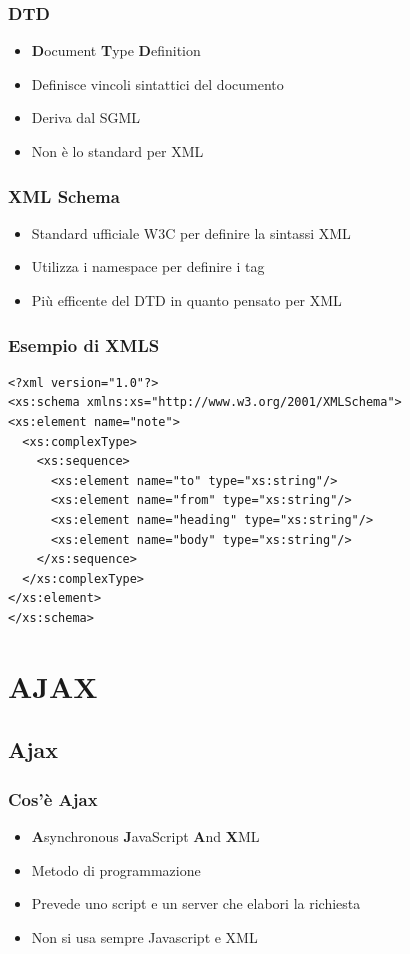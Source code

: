 \documentclass{beamer}
\begin{document}
\begin{frame}
    \frametitle{DTD}
    \begin{itemize}
    \item <1-> \textbf{D}ocument \textbf{T}ype \textbf{D}efinition
    \item <2-> Definisce vincoli sintattici del documento
    \item <3-> Deriva dal SGML
    \item <5-> Non è lo standard per XML
    \end{itemize}
\end{frame}

\begin{frame}
\frametitle{XML Schema}
\begin{itemize}
    \item <1-> Standard ufficiale W3C per definire la sintassi XML
    \item <2-> Utilizza i namespace per definire i tag
    \item <3-> Più efficente del DTD in quanto pensato per XML
\end{itemize}
\end{frame}

\begin{frame}[fragile]
\frametitle{Esempio di XMLS}
\begin{verbatim}
<?xml version="1.0"?>
<xs:schema xmlns:xs="http://www.w3.org/2001/XMLSchema">
<xs:element name="note">
  <xs:complexType>
    <xs:sequence>
      <xs:element name="to" type="xs:string"/>
      <xs:element name="from" type="xs:string"/>
      <xs:element name="heading" type="xs:string"/>
      <xs:element name="body" type="xs:string"/>
    </xs:sequence>
  </xs:complexType>
</xs:element>
</xs:schema>
\end{verbatim}
\end{frame}


\section{AJAX}
\subsection{Ajax}
\begin{frame}
    \frametitle{Cos'è Ajax}
    \begin{itemize}
    \item <1-> \textbf{A}synchronous \textbf{J}avaScript \textbf{A}nd \textbf{X}ML
    \item <2-> Metodo di programmazione 
    \item <3-> Prevede uno script e un server che elabori la richiesta
    \item <4-> Non si usa sempre Javascript e XML
    \end{itemize}
\end{frame}
\end{document}
